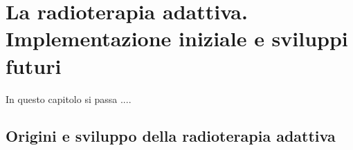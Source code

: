 \chapter{La radioterapia adattiva. Implementazione iniziale e sviluppi futuri}
\minitoc
\textsf{In questo capitolo si passa ....}

\section{Origini e sviluppo della radioterapia adattiva}













